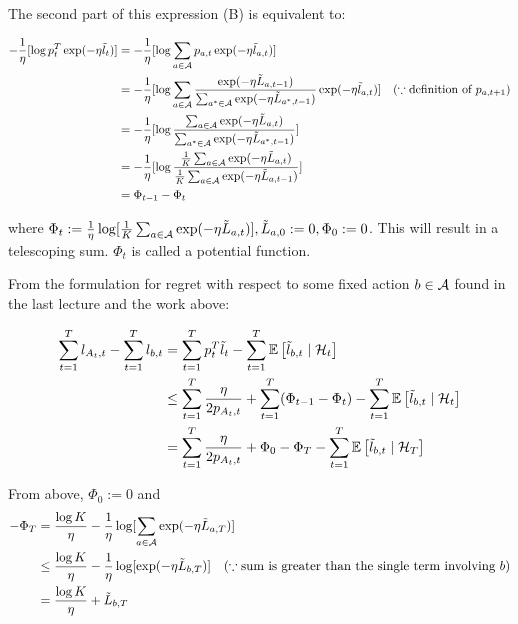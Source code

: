 \documentclass[11pt]{article}
\begin{document}
The second part of this expression (B) is equivalent to: 

\begin{align*}
-\frac{1}{\eta} [\log p_t^T \exp (-\eta \tilde l_t)] &= -\frac{1}{\eta} [\log \sum_{a \in \mathcal{A}} p_{a, t} \exp (-\eta \tilde l_{a,t})] \\
&= -\frac{1}{\eta} [\log \sum_{a \in \mathcal{A}} \frac{\exp (-\eta \tilde L_{a, t-1})}{\sum_{a^* \in \mathcal{A}} \exp (-\eta \tilde L_{a^*, t-1})} \exp(-\eta \tilde l_{a,t})] ~~~ (\because \text{definition of } p_{a, t+1}) \\
&= -\frac{1}{\eta} [\log \frac{\sum_{a \in \mathcal{A}} \exp(-\eta \tilde L_{a,t})}{\sum_{a^* \in \mathcal{A}} \exp(-\eta \tilde L_{a^*, t-1})}] \\
&= -\frac{1}{\eta} [\log \frac{\frac{1}{K}\sum_{a \in \mathcal{A}} \exp(-\eta \tilde L_{a,t})}{\frac{1}{K}\sum_{a \in \mathcal{A}} \exp(-\eta \tilde L_{a, t-1})}] \\
&= \Phi_{t-1} - \Phi_{t} \\
\end{align*}

where $\Phi_t := \frac{1}{\eta} \log[\frac{1}{K} \sum_{a \in \mathcal{A}} \exp(-\eta \tilde L_{a,t})], \tilde L_{a,0} := 0, \Phi_0 :=0$.  This will result in a telescoping sum. $\Phi_t$ is called a potential function.

From the formulation for regret with respect to some fixed action $b \in \mathcal{A}$ found in the last lecture and the work above:

\begin{align*}
\sum_{t=1}^T l_{A_t, t} - \sum_{t=1}^T l_{b,t} &= \sum_{t=1}^T p_t^T \tilde l_t - \sum_{t=1}^T \mathbb{E}\left[ \tilde l_{b, t} \mid \mathcal{H}_t \right]  \\
&\leq \sum_{t=1}^T \frac{\eta}{2 p_{A_t, t}} + \sum_{t=1}^T (\Phi_{t-1} - \Phi_{t}) - \sum_{t=1}^T \mathbb{E}\left[ \tilde l_{b,t} \mid \mathcal{H}_{t} \right] \\
&= \sum_{t=1}^T \frac{\eta}{2 p_{A_t, t}} + \Phi_0 - \Phi_T -\sum_{t=1}^T \mathbb{E}\left[ \tilde l_{b,t}\mid\mathcal{H}_T \right]
\end{align*}

From above, $\Phi_0 := 0$ and 
\begin{align*}
-\Phi_T &= \frac{\log K}{\eta} -\frac{1}{\eta} \log[\sum_{a \in \mathcal{A}} \exp( -\eta \tilde L_{a,T})] \\
&\leq \frac{\log K}{\eta} -\frac{1}{\eta} \log[\exp(-\eta \tilde L_{b, T})] ~~~ (\because \text{sum is greater than the single term involving $b$}) \\
&= \frac{\log K}{\eta} + \tilde L_{b,T}
\end{align*}
\end{document}
